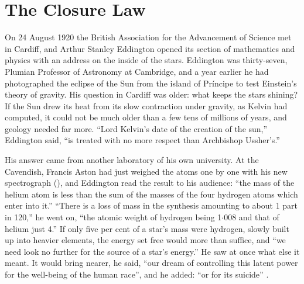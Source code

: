 \makeatletter
{}
\makeatother
\providecommand{\Lop}{\mathcal{L}}
\chapter{The Closure Law}\label{ch:closure}



On 24 August 1920 the British Association for the Advancement of Science met in Cardiff, and Arthur Stanley Eddington opened its section of mathematics and physics with an address on the inside of the stars. Eddington was thirty-seven, Plumian Professor of Astronomy at Cambridge, and a year earlier he had photographed the eclipse of the Sun from the island of Pr\'incipe to test Einstein's theory of gravity. His question in Cardiff was older: what keeps the stars shining? If the Sun drew its heat from its slow contraction under gravity, as Kelvin had computed, it could not be much older than a few tens of millions of years, and geology needed far more. \enquote{Lord Kelvin's date of the creation of the sun,} Eddington said, \enquote{is treated with no more respect than Archbishop Ussher's.}

His answer came from another laboratory of his own university. At the Cavendish, Francis Aston had just weighed the atoms one by one with his new spectrograph (), and Eddington read the result to his audience: \enquote{the mass of the helium atom is less than the sum of the masses of the four hydrogen atoms which enter into it.} \enquote{There is a loss of mass in the synthesis amounting to about 1 part in 120,} he went on, \enquote{the atomic weight of hydrogen being 1$\cdot$008 and that of helium just 4.} If only five per cent of a star's mass were hydrogen, slowly built up into heavier elements, the energy set free would more than suffice, and \enquote{we need look no further for the source of a star's energy.} He saw at once what else it meant. It would bring nearer, he said, \enquote{our dream of controlling this latent power for the well-being of the human race}, and he added: \enquote{or for its suicide} \citep{Eddington1920}.


